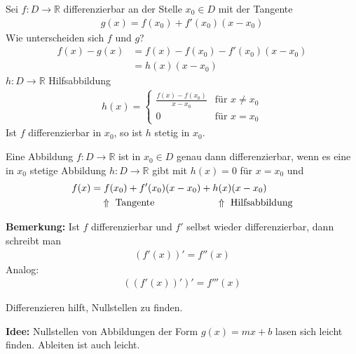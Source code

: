 
Sei $f : D \rightarrow \mathbb{R}$ differenzierbar an der Stelle $x_0 \in D$ mit der Tangente
\begin{align*}
	g(x) = f(x_0)+f'(x_0)(x-x_0)
\end{align*}
Wie unterscheiden sich $f$ und $g$?
\begin{align*}
	f(x) - g(x) &= f(x) - f(x_0) - f'(x_0)(x-x_0) \\
	&= h(x)(x-x_0)
\end{align*}
$h : D \rightarrow \mathbb{R}$ Hilfsabbildung
\begin{align*}
	h(x) = \begin{cases}
		\frac{f(x)-f(x_0)}{x-x_0} & \text{für }x\neq x_0 \\
		0 &\text{für }x=x_0
	\end{cases}
\end{align*}
Ist $f$ differenzierbar in $x_0$, so ist $h$ stetig in $x_0$.

Eine Abbildung $f : D \rightarrow \mathbb{R}$ ist in $x_0 \in D$ genau dann differenzierbar, wenn es eine in $x_0$ stetige Abbildung $h : D \rightarrow \mathbb{R}$ gibt mit $h(x) = 0$ für $x = x_0$ und
\begin{align*}
	f(x) &= f(x_0)+f'(x_0)(x-x_0) + h(x)(x-x_0) \\
	&\quad\Uparrow\text{ Tangente}\hspace{2.2cm}\Uparrow\text{ Hilfsabbildung}%
\end{align*}

\bigskip
\textbf{Bemerkung:} Ist $f$ differenzierbar und $f'$ selbst wieder differenzierbar, dann schreibt man
\begin{align*}
	(f'(x))' = f''(x)
\end{align*}
Analog:
\begin{align*}
	((f'(x))')' = f'''(x)
\end{align*}

Differenzieren hilft, Nullstellen zu finden.

\textbf{Idee:} Nullstellen von Abbildungen der Form $g(x) = mx+b$ lasen sich leicht finden. Ableiten ist auch \glqq{}leicht\grqq{}.

\bigskip
{}

